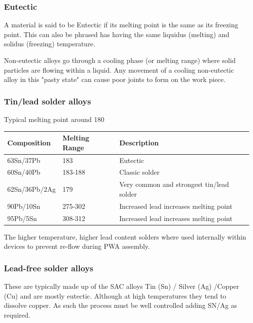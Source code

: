 \documentclass{article}
\begin{document}
		\subsubsection{Eutectic}
		A material is said to be Eutectic if its melting point is the same as its freezing point. 
		This can also be phrased has having the same liquidus (melting) and solidus (freezing) temperature.
		
		Non-eutectic alloys go through a cooling phase (or melting range) where solid particles are flowing within a liquid. Any movement of a cooling non-eutectic alloy in this "pasty state" can cause poor joints to form on the work piece.  		
	
		\subsubsection{Tin/lead solder alloys}	 
		 Typical melting point around 180\degree
		\begin{center}
 			\begin{tabular}{| m{10em} | m{5em}| m{17em} | } 
 			\hline
 			\textbf{Composition} & \textbf{Melting Range} & \textbf{Description} \\ [0.5ex] 
 			\hline\hline
 			63Sn/37Pb & 183\degree & Eutectic  \\ 
 			\hline
 			60Sn/40Pb & 183-188\degree & Classic solder \\
 			\hline
 			62Sn/36Pb/2Ag & 179\degree & Very common and strongest tin/lead solder \\
 			\hline
 			90Pb/10Sn & 275-302\degree & Increased lead increases melting point \\
 			\hline
 			95Pb/5Sn & 308-312\degree & Increased lead increases melting point \\
 			\hline
			\end{tabular}
		\end{center}
The higher temperature, higher lead content solders where used internally within devices to prevent re-flow during PWA assembly.
				
		\subsubsection{Lead-free solder alloys}
		These are typically made up of the SAC alloys Tin (Sn) / Silver (Ag) /Copper (Cu) and are mostly eutectic. 
		Although at high temperatures they tend to dissolve copper. 
		As such the process must be well controlled adding SN/Ag as required.
				
\end{document}
